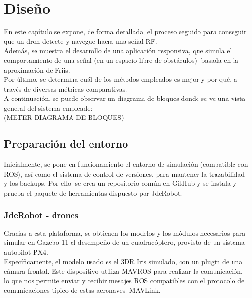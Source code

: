 \chapter{Diseño}
\label{cap:capitulo4}

En este capítulo se expone, de forma detallada, el proceso seguido para conseguir que un dron detecte y navegue hacia una señal \ac{RF}.\\

Además, se muestra el desarrollo de una aplicación responsiva, que simula el comportamiento de una señal (en un espacio libre de obstáculos), basada en la aproximación de Friis.\\

Por último, se determina cuál de los métodos empleados es mejor y por qué, a través de diversas métricas comparativas.\\

A continuación, se puede observar un diagrama de bloques donde se ve una vista general del sistema empleado:\\

(METER DIAGRAMA DE BLOQUES)\\

\section{Preparación del entorno}
\label{sec:preparacion_del_entorno}

Inicialmente, se pone en funcionamiento el entorno de simulación (compatible con \ac{ROS}), así como el sistema de control de versiones, para mantener la trazabilidad y los backups. Por ello, se crea un repositorio común en GitHub y se instala y prueba el paquete de herramientas dispuesto por JdeRobot.

\subsection{JdeRobot - drones}
\label{subsec:jderobot_drones}

Gracias a esta plataforma, se obtienen los modelos y los módulos necesarios para simular en Gazebo 11 el desempeño de un cuadracóptero, provisto de un sistema autopilot PX4.\\

Específicamente, el modelo usado es el 3DR Iris simulado, con un plugin de una cámara frontal. Este dispositivo utiliza MAVROS para realizar la comunicación, lo que nos permite enviar y recibir mesajes ROS compatibles con el protocolo de comunicaciones típico de estas aeronaves, MAVLink.\\

